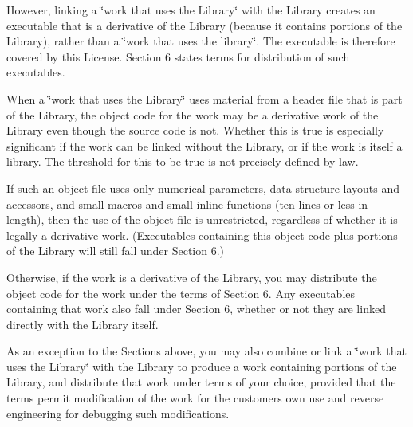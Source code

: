 However, linking a \char`\"{}work that uses the Library\char`\"{} with the Library creates an executable that is a derivative of the Library (because it contains portions of the Library), rather than a \char`\"{}work that uses the
library\char`\"{}. The executable is therefore covered by this License. Section 6 states terms for distribution of such executables.

When a \char`\"{}work that uses the Library\char`\"{} uses material from a header file that is part of the Library, the object code for the work may be a derivative work of the Library even though the source code is not. Whether this is true is especially significant if the work can be linked without the Library, or if the work is itself a library. The threshold for this to be true is not precisely defined by law.

If such an object file uses only numerical parameters, data structure layouts and accessors, and small macros and small inline functions (ten lines or less in length), then the use of the object file is unrestricted, regardless of whether it is legally a derivative work. (Executables containing this object code plus portions of the Library will still fall under Section 6.)

Otherwise, if the work is a derivative of the Library, you may distribute the object code for the work under the terms of Section 6. Any executables containing that work also fall under Section 6, whether or not they are linked directly with the Library itself.


\begin{DoxyEnumerate}
\item As an exception to the Sections above, you may also combine or link a \char`\"{}work that uses the Library\char`\"{} with the Library to produce a work containing portions of the Library, and distribute that work under terms of your choice, provided that the terms permit modification of the work for the customer\textquotesingle{}s own use and reverse engineering for debugging such modifications.
\end{DoxyEnumerate}

